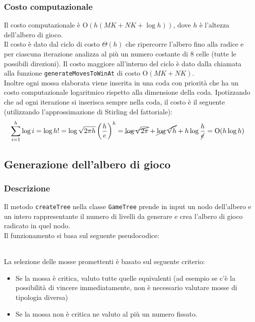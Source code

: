 \documentclass[11pt]{article}
\begin{document}
\subsubsection*{Costo computazionale}
Il costo computazionale è O$(h(MK+NK+\log h))$, dove $h$ è l'altezza dell'albero di gioco.\\
Il costo è dato dal ciclo di costo $\Theta(h)$ che ripercorre l'albero fino alla radice e per ciascuna iterazione analizza al più un numero costante di 8 celle (tutte le possibili direzioni). Il costo maggiore all'interno del ciclo è dato dalla chiamata alla funzione \texttt{generateMovesToWinAt} di costo O$(MK+NK)$.\\
Inoltre ogni mossa elaborata viene inserita in una coda con priorità che ha un costo computazionale logaritmico rispetto alla dimensione della coda. Ipotizzando che ad ogni iterazione si inserisca sempre nella coda, il costo è il seguente (utilizzando l'approssimazione di Stirling del fattoriale):
\begin{align*}
\sum_{i=1}^{h} \log i = \log h! = \log \sqrt{2\pi h} \left(\dfrac{h}{e}\right)^h = \cancel{\log \sqrt{2 \pi}} + \cancel{\log \sqrt{h}} + h \log \dfrac{h}{\cancel{e}} = \text{O}(h \log h)
\end{align*}

\subsection*{Generazione dell'albero di gioco}
\subsubsection*{Descrizione}
Il metodo \texttt{createTree} nella classe \texttt{GameTree} prende in input un nodo dell'albero e un intero rappresentante il numero di livelli da generare e crea l'albero di gioco radicato in quel nodo.\\
Il funzionamento si basa sul seguente pseudocodice:
\begin{algorithm*}
\SetAlgoLined
{}
\end{algorithm*}\\
La selezione delle mosse promettenti è basato sul seguente criterio:
\begin{itemize}
\setlength\itemsep{0.05cm}
	\item Se la mossa è critica, valuto tutte quelle equivalenti (ad esempio se c'è la possibilità di vincere immediatamente, non è necessario valutare mosse di tipologia diversa)
	\item Se la mossa non è critica ne valuto al più un numero fissato.
\end{itemize}
\end{document}
